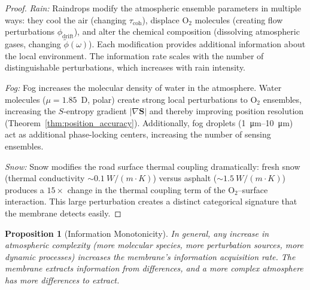 \documentclass[twocolumn,10pt]{article}
\newtheorem{proposition}[theorem]{Proposition}
\theoremstyle{definition}
\theoremstyle{remark}
\begin{document}
\begin{proof}
\emph{Rain:} Raindrops modify the atmospheric ensemble parameters in multiple ways: they cool the air (changing $\tau_{\mathrm{coh}}$), displace $\mathrm{O}_2$ molecules (creating flow perturbations $\phi_{\mathrm{drift}}$), and alter the chemical composition (dissolving atmospheric gases, changing $\tilde{\phi}(\omega)$). Each modification provides additional information about the local environment. The information rate scales with the number of distinguishable perturbations, which increases with rain intensity.

\emph{Fog:} Fog increases the molecular density of water in the atmosphere. Water molecules ($\mu = 1.85$~D, polar) create strong local perturbations to $\mathrm{O}_2$ ensembles, increasing the $S$-entropy gradient $|\nabla\mathbf{S}|$ and thereby improving position resolution (Theorem~\ref{thm:position_accuracy}). Additionally, fog droplets (\SI{1}{\micro m}--\SI{10}{\micro m}) act as additional phase-locking centers, increasing the number of sensing ensembles.

\emph{Snow:} Snow modifies the road surface thermal coupling dramatically: fresh snow (thermal conductivity $\sim \SI{0.1}{W/(m\cdot K)}$) versus asphalt ($\sim \SI{1.5}{W/(m\cdot K)}$) produces a $15\times$ change in the thermal coupling term of the $\mathrm{O}_2$--surface interaction. This large perturbation creates a distinct categorical signature that the membrane detects easily.
\end{proof}

\begin{proposition}[Information Monotonicity]
\label{prop:info_monotone}
In general, any increase in atmospheric complexity (more molecular species, more perturbation sources, more dynamic processes) increases the membrane's information acquisition rate. The membrane extracts information from \emph{differences}, and a more complex atmosphere has more differences to extract.
\end{proposition}
\end{document}
